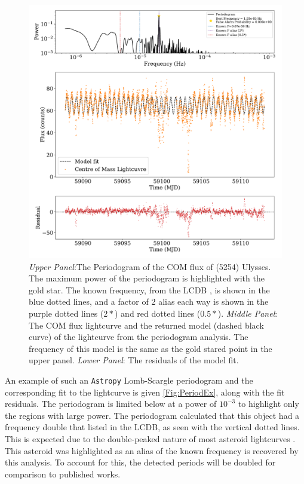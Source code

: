 \documentclass{UCreport}
\begin{document}
\begin{figure}[!t]
  \centering
  \includegraphics[width=\textwidth]{./Figures/PeriodogramUlyssesResid.pdf}
  \caption[Periodogram example]{\textit{Upper Panel}:The Periodogram of the COM flux of (5254) Ulysses.
    The maximum power of the periodogram is highlighted with the gold star.
    The known frequency, from the LCDB \citep{Warner2009}, is shown in the blue dotted lines, and a factor of 2 alias each way is shown in the purple dotted lines ($2*$) and red dotted lines ($0.5*$).
    \textit{Middle Panel}: The COM flux lightcurve and the returned model (dashed black curve) of the lightcurve from the periodogram analysis.
    The frequency of this model is the same as the gold stared point in the upper panel.
    \textit{Lower Panel}: The residuals of the model fit.
  }
  \label{Fig:PeriodEx}
\end{figure}


An example of such an \texttt{Astropy} Lomb-Scargle periodogram and the corresponding fit to the lightcurve is given \autoref{Fig:PeriodEx}, along with the fit residuals.
The periodogram is limited below at a power of $10^{-3}$ to highlight only the regions with large power. 
The periodogram calculated that this object had a frequency double that listed in the LCDB, as seen with the vertical dotted lines.
This is expected due to the double-peaked nature of most asteroid lightcurves \citep{McNeill2023}.
This asteroid was highlighted as an alias of the known frequency is recovered by this analysis.
To account for this, the detected periods will be doubled for comparison to published works.
\end{document}
